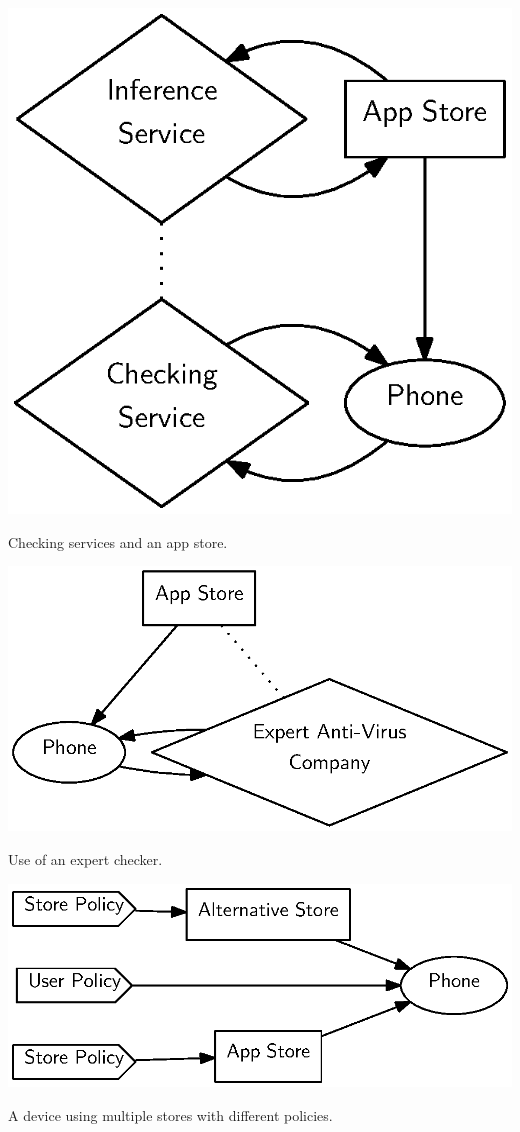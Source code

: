 \documentclass[a4paper,sfsidenotes]{tufte-book}
\begin{document}
\begin{marginfigure}
  \label{fig:de}
  \includegraphics[width=\linewidth]{img/digitalevidence.eps}
  \caption{Checking services and an app store.}
\end{marginfigure}

\begin{marginfigure}
  \label{fig:mcafee}
  \includegraphics[width=\linewidth]{img/mcafee.eps}
  \caption{Use of an expert checker.}
\end{marginfigure}

\begin{marginfigure}
  \label{fig:altstore}
  \includegraphics[width=\linewidth]{img/altstore.eps}
  \caption{A device using multiple stores with different policies.}
\end{marginfigure}
\end{document}
